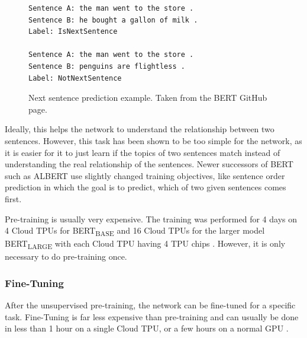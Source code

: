 \begin{figure}[h]
\begin{lstlisting}[numbers=none]
Sentence A: the man went to the store .
Sentence B: he bought a gallon of milk .
Label: IsNextSentence

Sentence A: the man went to the store .
Sentence B: penguins are flightless .
Label: NotNextSentence
\end{lstlisting}
\caption[Next sentence prediction example]{Next sentence prediction example. Taken from the BERT GitHub page.}
\label{fig:bert_next_sentence_example}
\end{figure}

Ideally, this helps the network to understand the relationship between two sentences.
However, this task has been shown to be too simple for the network, as it is easier for it to just learn if the topics of two sentences match instead of understanding the real relationship of the sentences.
Newer successors of BERT such as ALBERT use slightly changed training objectives, like sentence order prediction \cite[p.~3]{1909.11942} in which the goal is to predict, which of two given sentences comes first.

Pre-training is usually very expensive.
The training was performed for 4 days on 4 Cloud TPUs for BERT\textsubscript{BASE} and 16 Cloud TPUs for the larger model BERT\textsubscript{LARGE} with each Cloud TPU having 4 TPU chips \cite[p.~13]{devlin2018bert}.
However, it is only necessary to do pre-training once.

\subsubsection{Fine-Tuning}

After the unsupervised pre-training, the network can be fine-tuned for a specific task.
Fine-Tuning is far less expensive than pre-training and can usually be done in less than 1 hour on a single Cloud TPU, or a few hours on a normal GPU \cite[p.~5]{devlin2018bert}.
